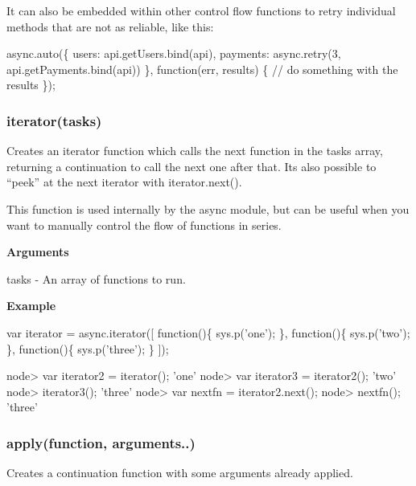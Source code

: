 It can also be embedded within other control flow functions to retry individual methods that are not as reliable, like this\+:


\begin{DoxyCode}
async.auto(\{
    users: api.getUsers.bind(api),
    payments: async.retry(3, api.getPayments.bind(api))
\}, function(err, results) \{
  // do something with the results
\});
\end{DoxyCode}






\label{_iterator}%
 \subsubsection*{iterator(tasks)}

Creates an iterator function which calls the next function in the {\ttfamily tasks} array, returning a continuation to call the next one after that. It\textquotesingle{}s also possible to “peek” at the next iterator with {\ttfamily iterator.\+next()}.

This function is used internally by the {\ttfamily async} module, but can be useful when you want to manually control the flow of functions in series.

{\bfseries Arguments}


\begin{DoxyItemize}
\item {\ttfamily tasks} -\/ An array of functions to run.
\end{DoxyItemize}

{\bfseries Example}


\begin{DoxyCode}
var iterator = async.iterator([
    function()\{ sys.p('one'); \},
    function()\{ sys.p('two'); \},
    function()\{ sys.p('three'); \}
]);

node> var iterator2 = iterator();
'one'
node> var iterator3 = iterator2();
'two'
node> iterator3();
'three'
node> var nextfn = iterator2.next();
node> nextfn();
'three'
\end{DoxyCode}
 



\label{_apply}%
 \subsubsection*{apply(function, arguments..)}

Creates a continuation function with some arguments already applied.

